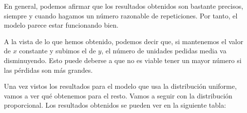 \documentclass[11pt,a4paper]{report}
\begin{document}
En general, podemos afirmar que los resultados obtenidos son bastante precisos, siempre y cuando hagamos un número
razonable de repeticiones. Por tanto, el modelo parece estar funcionando bien.

A la vista de lo que hemos obtenido, podemos decir que, si mantenemos el valor de $x$ constante y subimos el de $y$,
el número de unidades pedidas media va disminuyendo. Esto puede deberse a que no es viable tener un mayor número si
las pérdidas son más grandes.

Una vez vistos los resultados para el modelo que usa la distribución uniforme, vamos a ver qué obtenemos para el resto.
Vamos a seguir con la distribución proporcional. Los resultados obtenidos se pueden ver en la siguiente tabla:

\end{document}
